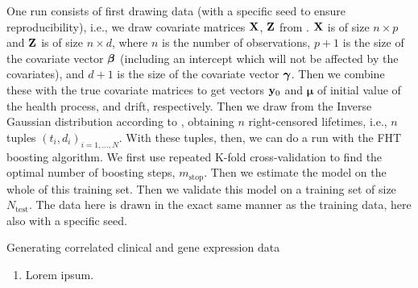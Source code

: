 One run consists of first drawing data (with a specific seed to ensure reproducibility), i.e., we draw covariate matrices $\mathbf{X}$, $\mathbf{Z}$ from \label{algo:clinical-sim}. $\mathbf{X}$ is of size $n\times p$ and $\mathbf{Z}$ is of size $n\times d$, where $n$ is the number of observations, $p+1$ is the size of the covariate vector $\boldsymbol{\beta}$ (including an intercept which will not be affected by the covariates), and $d+1$ is the size of the covariate vector $\boldsymbol{\gamma}$. Then we combine these with the true covariate matrices to get vectors $\mathbf{y}_0$ and $\mathbf{\mu}$ of initial value of the health process, and drift, respectively. Then we draw from the Inverse Gaussian distribution according to \label{algo:FHT-sim}, obtaining $n$ right-censored lifetimes, i.e., $n$ tuples $(t_i,d_i)_{i=1,\ldots,N}$. With these tuples, then, we can do a run with the FHT boosting algorithm. We first use repeated K-fold cross-validation to find the optimal number of boosting steps, $m_{\text{stop}}$. Then we estimate the model on the whole of this training set. Then we validate this model on a training set of size $N_{\text{test}}$. The data here is drawn in the exact same manner as the training data, here also with a specific seed.

\begin{algorithm}
\caption{Generating correlated clinical and gene expression data}
\label{algo:clinical-sim}
\begin{enumerate}
    \item Lorem ipsum.
\end{enumerate}
\end{algorithm}

